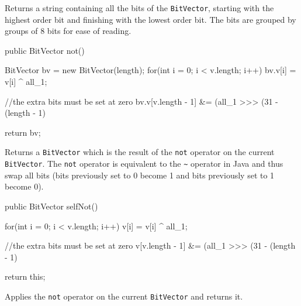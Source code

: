 \begin{tabb} Returns a string containing all the bits of the \texttt{BitVector},
  starting with the highest order bit and finishing with the lowest order bit.
  The bits are grouped by groups of 8 bits for ease of reading.
\end{tabb}
\begin{htmlonly}
\end{htmlonly}
\begin{code}

   public BitVector not() \begin{hide} {
      BitVector bv = new BitVector(length);
      for(int i = 0; i < v.length; i++)
         bv.v[i] = v[i] ^ all_1;

      //the extra bits must be set at zero
      bv.v[v.length - 1] &= (all_1 >>> (31 - (length - 1) %

      return bv;
   } \end{hide} 
\end{code}
\begin{tabb} Returns a \texttt{BitVector} which is the result of the \texttt{not}
  operator on the current \texttt{BitVector}. The \texttt{not} operator is 
  equivalent to the \verb!~! operator in Java and thus swap all bits (bits 
  previously set to 0 become 1 and bits previously set to 1 become 0).
\end{tabb}
\begin{htmlonly}
\end{htmlonly}
\begin{code}

   public BitVector selfNot() \begin{hide} {
      for(int i = 0; i < v.length; i++)
         v[i] = v[i] ^ all_1;

      //the extra bits must be set at zero
      v[v.length - 1] &= (all_1 >>> (31 - (length - 1) %

      return this;
   } \end{hide}
\end{code}
\begin{tabb} Applies the \texttt{not} operator on the current \texttt{BitVector}
  and returns it.
\end{tabb}
\begin{htmlonly}
\end{htmlonly}
